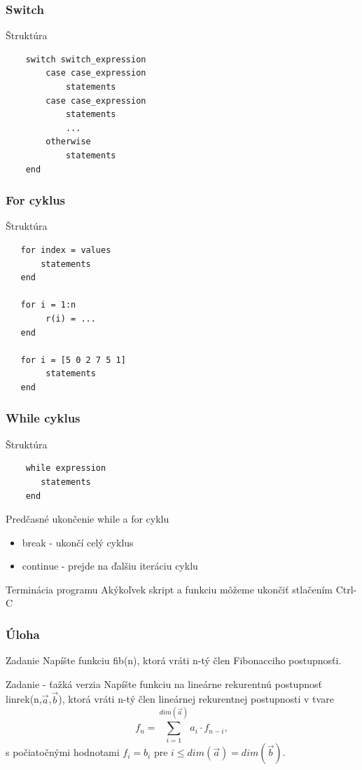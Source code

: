 \documentclass{beamer}
\begin{document}
\begin{frame}[fragile]
\frametitle{Switch}
  \begin{block}{Štruktúra}
  \begin{verbatim}
    switch switch_expression
        case case_expression
            statements
        case case_expression
            statements
            ...
        otherwise
            statements
    end \end{verbatim}
  \end{block}
\end{frame}

\begin{frame}[fragile]
\frametitle{For cyklus}
  \begin{block}{Štruktúra}
  \begin{verbatim}
   for index = values
       statements
   end
   
   for i = 1:n
       	r(i) = ...
   end
   
   for i = [5 0 2 7 5 1]
       	statements
   end \end{verbatim}
  \end{block}
\end{frame}

\begin{frame}[fragile]
\frametitle{While cyklus}
  \begin{block}{Štruktúra}
  \begin{verbatim}
    while expression
       statements
    end \end{verbatim}
  \end{block}
  
  \pause
  
  \begin{block}{Predčasné ukončenie while a for cyklu}
  \begin{itemize}
      \item break - ukončí celý cyklus
      \item continue - prejde na ďalšiu iteráciu cyklu
  \end{itemize}
  \end{block}
  
  \pause
  
  \begin{alertblock}{Terminácia programu}
    Akýkoľvek skript a funkciu môžeme ukončiť stlačením Ctrl-C
  \end{alertblock}  
\end{frame}

\begin{frame}
\frametitle{Úloha}
  \begin{block}{Zadanie}
  Napíšte funkciu fib(n), ktorá vráti n-tý člen Fibonacciho postupnosťi.
  \end{block}

  \begin{block}{Zadanie - ťažká verzia}
  Napíšte funkciu na lineárne rekurentnú postupnosť linrek(n,$\vec{a}$,$\vec{b}$), ktorá vráti n-tý člen lineárnej rekurentnej postupnosti v tvare $$f_n = \sum_{i = 1}^{dim(\vec{a})} a_i \cdot f_{n-i},$$ s počiatočnými hodnotami $f_i = b_i$ pre $i \leq dim(\vec{a}) = dim(\vec{b})$.
  \end{block}
\end{frame}  
\end{document}
